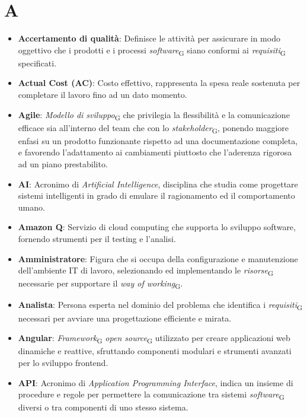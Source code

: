 \section{A}
\begin{itemize}
    \item \textbf{Accertamento di qualità}: Definisce le attività per assicurare in modo oggettivo che i prodotti e i processi \textit{software}\textsubscript{G} siano conformi ai \textit{requisiti}\textsubscript{G} specificati.
    \item \textbf{Actual Cost (AC)}: Costo effettivo, rappresenta la spesa reale sostenuta per completare il lavoro fino ad un dato momento.
    \item \textbf{Agile}: \textit{Modello di sviluppo}\textsubscript{G} che privilegia la flessibilità e la comunicazione efficace sia all'interno del team che con lo \textit{stakeholder}\textsubscript{G}, ponendo maggiore enfasi su un prodotto funzionante rispetto ad una documentazione completa, e favorendo l'adattamento ai cambiamenti piuttosto che l'aderenza rigorosa ad un piano prestabilito.
    \item \textbf{AI}: Acronimo di \textit{Artificial Intelligence}, disciplina che studia come progettare sistemi intelligenti in grado di emulare il ragionamento ed il comportamento umano.
     \item \textbf{Amazon Q}: Servizio di cloud computing che supporta lo sviluppo software, fornendo strumenti per il testing e l’analisi.
    \item \textbf{Amministratore}: Figura che si occupa della configurazione e manutenzione dell'ambiente IT di lavoro, selezionando ed implementando le \textit{risorse}\textsubscript{G} necessarie per supportare il \textit{way of working}\textsubscript{G}.
    \item \textbf{Analista}: Persona esperta nel dominio del problema che identifica i \textit{requisiti}\textsubscript{G} necessari per avviare una progettazione efficiente e mirata.
    \item \textbf{Angular}: \textit{Framework}\textsubscript{G} \textit{open source}\textsubscript{G} utilizzato per creare applicazioni web dinamiche e reattive, sfruttando componenti modulari e strumenti avanzati per lo sviluppo frontend.
    \item \textbf{API}: Acronimo di \textit{Application Programming Interface}, indica un insieme di procedure e regole per permettere la comunicazione tra sistemi \textit{software}\textsubscript{G} diversi o tra componenti di uno stesso sistema.

\end{itemize}

